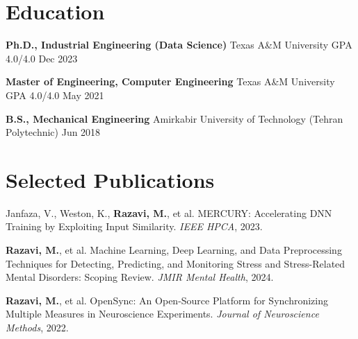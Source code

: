 \documentclass[letterpaper,10pt]{article}
\begin{document}
\section{Education}
\textbf{Ph.D., Industrial Engineering (Data Science)} \textbar{} Texas A\&M University \textbar{} GPA 4.0/4.0 \hfill Dec 2023\par
\textbf{Master of Engineering, Computer Engineering} \textbar{} Texas A\&M University \textbar{} GPA 4.0/4.0 \hfill May 2021\par
\textbf{B.S., Mechanical Engineering} \textbar{} Amirkabir University of Technology (Tehran Polytechnic) \hfill Jun 2018\par

\section{Selected Publications}
Janfaza, V., Weston, K., \textbf{Razavi, M.}, et al. MERCURY: Accelerating DNN Training by Exploiting Input Similarity. \textit{IEEE HPCA}, 2023.\par\vspace{1.5pt}
\textbf{Razavi, M.}, et al. Machine Learning, Deep Learning, and Data Preprocessing Techniques for Detecting, Predicting, and Monitoring Stress and Stress-Related Mental Disorders: Scoping Review. \textit{JMIR Mental Health}, 2024.\par\vspace{1.5pt}
\textbf{Razavi, M.}, et al. OpenSync: An Open-Source Platform for Synchronizing Multiple Measures in Neuroscience Experiments. \textit{Journal of Neuroscience Methods}, 2022.\par
\end{document}
